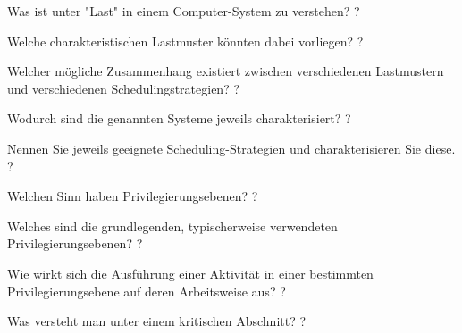\documentclass[avery5371]{flashcards}
\begin{document}
\begin{flashcard}{Was ist unter "Last" in einem Computer-System zu verstehen?}
    ?
\end{flashcard}

\begin{flashcard}{Welche charakteristischen Lastmuster könnten dabei vorliegen?}
    ?
\end{flashcard}

\begin{flashcard}{Welcher mögliche Zusammenhang existiert zwischen verschiedenen Lastmustern und verschiedenen Schedulingstrategien?}
    ?
\end{flashcard}

\begin{flashcard}{Wodurch sind die genannten Systeme jeweils charakterisiert?}
    ?
\end{flashcard}

\begin{flashcard}{Nennen Sie jeweils geeignete Scheduling-Strategien und charakterisieren Sie diese.}
    ?
\end{flashcard}

\begin{flashcard}[Privilegierungsebenen]{Welchen Sinn haben Privilegierungsebenen?}
    ?
\end{flashcard}

\begin{flashcard}[Privilegierungsebenen]{Welches sind die grundlegenden, typischerweise verwendeten Privilegierungsebenen?}
    ?
\end{flashcard}

\begin{flashcard}[Privilegierungsebenen]{Wie wirkt sich die Ausführung einer Aktivität in einer bestimmten Privilegierungsebene auf deren Arbeitsweise aus?}
    ?
\end{flashcard}

\begin{flashcard}{Was versteht man unter einem kritischen Abschnitt?}
    ?
\end{flashcard}
\end{document}
